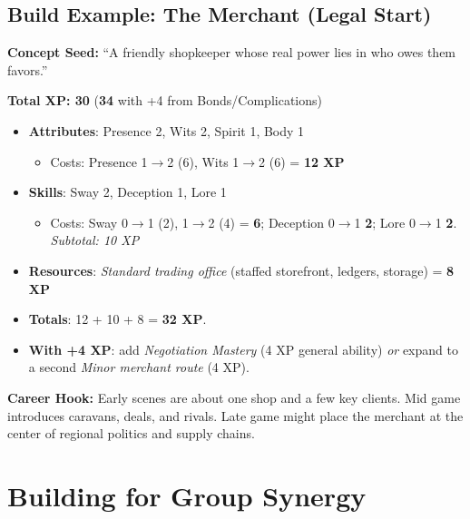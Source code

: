 \subsection*{Build Example: The Merchant (Legal Start)}

\textbf{Concept Seed:} ``A friendly shopkeeper whose real power lies in who owes them favors.''

\medskip

\noindent\textbf{Total XP: 30} \quad (\textbf{34} with +4 from Bonds/Complications)

\begin{itemize}
\item \textbf{Attributes}: Presence 2, Wits 2, Spirit 1, Body 1
  \begin{itemize}
  \item Costs: Presence 1\(\to\)2 (6), Wits 1\(\to\)2 (6) = \textbf{12 XP}
  \end{itemize}
\item \textbf{Skills}: Sway 2, Deception 1, Lore 1
  \begin{itemize}
  \item Costs: Sway 0\(\to\)1 (2), 1\(\to\)2 (4) = \textbf{6};  
        Deception 0\(\to\)1 \textbf{2};  
        Lore 0\(\to\)1 \textbf{2}.  
        \emph{Subtotal: 10 XP}
  \end{itemize}
\item \textbf{Resources}: \emph{Standard trading office} (staffed storefront, ledgers, storage) = \textbf{8 XP}
\item \textbf{Totals}: 12 + 10 + 8 = \textbf{32 XP}.
\item \textbf{With +4 XP}: add \emph{Negotiation Mastery} (4 XP general ability) \emph{or} expand to a second \emph{Minor merchant route} (4 XP).
\end{itemize}

\noindent\textbf{Career Hook:} Early scenes are about one shop and a few key clients.
Mid game introduces caravans, deals, and rivals. Late game might place the
merchant at the center of regional politics and supply chains.


\section{Building for Group Synergy}
\label{sec:xp-synergy}


